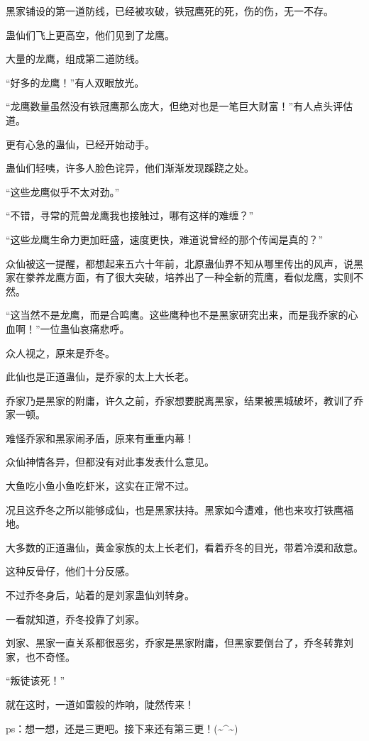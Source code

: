 \begin{this_body}
黑家铺设的第一道防线，已经被攻破，铁冠鹰死的死，伤的伤，无一不存。

蛊仙们飞上更高空，他们见到了龙鹰。

大量的龙鹰，组成第二道防线。

“好多的龙鹰！”有人双眼放光。

“龙鹰数量虽然没有铁冠鹰那么庞大，但绝对也是一笔巨大财富！”有人点头评估道。

更有心急的蛊仙，已经开始动手。

蛊仙们轻咦，许多人脸色诧异，他们渐渐发现蹊跷之处。

“这些龙鹰似乎不太对劲。”

“不错，寻常的荒兽龙鹰我也接触过，哪有这样的难缠？”

“这些龙鹰生命力更加旺盛，速度更快，难道说曾经的那个传闻是真的？”

众仙被这一提醒，都想起来五六十年前，北原蛊仙界不知从哪里传出的风声，说黑家在豢养龙鹰方面，有了很大突破，培养出了一种全新的荒鹰，看似龙鹰，实则不然。

“这当然不是龙鹰，而是合鸣鹰。这些鹰种也不是黑家研究出来，而是我乔家的心血啊！”一位蛊仙哀痛悲呼。

众人视之，原来是乔冬。

此仙也是正道蛊仙，是乔家的太上大长老。

乔家乃是黑家的附庸，许久之前，乔家想要脱离黑家，结果被黑城破坏，教训了乔家一顿。

难怪乔家和黑家闹矛盾，原来有重重内幕！

众仙神情各异，但都没有对此事发表什么意见。

大鱼吃小鱼小鱼吃虾米，这实在正常不过。

况且这乔冬之所以能够成仙，也是黑家扶持。黑家如今遭难，他也来攻打铁鹰福地。

大多数的正道蛊仙，黄金家族的太上长老们，看着乔冬的目光，带着冷漠和敌意。

这种反骨仔，他们十分反感。

不过乔冬身后，站着的是刘家蛊仙刘转身。

一看就知道，乔冬投靠了刘家。

刘家、黑家一直关系都很恶劣，乔家是黑家附庸，但黑家要倒台了，乔冬转靠刘家，也不奇怪。

“叛徒该死！”

就在这时，一道如雷般的炸响，陡然传来！

ps：想一想，还是三更吧。接下来还有第三更！(\~{}\^{}\~{})

\end{this_body}


